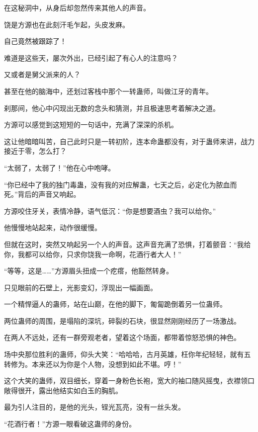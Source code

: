 
\begin{this_body}



在这秘洞中，从身后却忽然传来其他人的声音。

饶是方源也在此刻汗毛乍起，头皮发麻。

自己竟然被跟踪了！

难道是这些天，屡次外出，已经引起了有心人的注意吗？

又或者是舅父派来的人？

甚至在他的脑海中，还划过客栈中那个一转蛊师，叫做江牙的青年。

刹那间，他心中闪现出无数的念头和猜测，并且极速思考着解决之道。

方源可以感觉到这短短的一句话中，充满了深深的杀机。

这让他暗暗叫苦，自己此时只是一转初阶，连本命蛊都没有，对于蛊师来讲，战力接近于零，怎么打？

“太弱了，太弱了！”他在心中咆哮。

“你已经中了我的独门毒蛊，没有我的对应解蛊，七天之后，必定化为脓血而死。”背后的声音又响起。

方源咬住牙关，表情冷静，语气低沉：“你是想要酒虫？我可以给你。”

他慢慢地站起来，动作很缓慢。

但就在这时，突然又响起另一个人的声音。这声音充满了恐惧，打着颤音：“我给你，我都可以给你，只求你饶我一命啊，花酒行者大人！”

“等等，这是……”方源眉头扭成一个疙瘩，他豁然转身。

只见眼前的石壁上，光影变幻，浮现出一幅画面。

一个精悍逼人的蛊师，站在山巅，在他的脚下，匍匐跪倒着另一位蛊师。

两位蛊师的周围，是塌陷的深坑，碎裂的石块，很显然刚刚经历了一场激战。

在两人不远处，还有一群旁观老者，望着这个场面，都带着惊怒恐惧的神色。

场中央那位胜利的蛊师，仰头大笑：“哈哈哈，古月英雄，枉你年纪轻轻，就有五转修为。本来还以为你是个人物，没想到如此不堪。哼！”

这个大笑的蛊师，双目细长，穿着一身粉色长袍，宽大的袖口随风摇曳，衣襟领口敞得很开，露出他结实如白玉的胸肌。

最为引人注目的，是他的光头，锃光瓦亮，没有一丝头发。

“花酒行者！”方源一眼看破这蛊师的身份。


\end{this_body}
